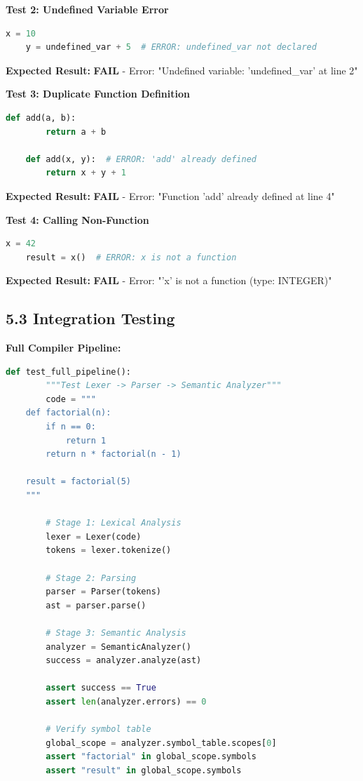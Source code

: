 \documentclass[a4paper,11pt]{article}
\newcommand{\statusissue}[1]{\colorbox{red!20}{\textbf{#1}}}
\begin{document}
    \textbf{Test 2: Undefined Variable Error}

    \begin{lstlisting}[language=Python, caption=Undefined Variable Detection]
    x = 10
    y = undefined_var + 5  # ERROR: undefined_var not declared
    \end{lstlisting}

    \textbf{Expected Result:} \statusissue{FAIL} - Error: "Undefined variable: 'undefined\_var' at line 2"

    \textbf{Test 3: Duplicate Function Definition}

    \begin{lstlisting}[language=Python, caption=Duplicate Definition Detection]
    def add(a, b):
        return a + b

    def add(x, y):  # ERROR: 'add' already defined
        return x + y + 1
    \end{lstlisting}

    \textbf{Expected Result:} \statusissue{FAIL} - Error: "Function 'add' already defined at line 4"

    \textbf{Test 4: Calling Non-Function}

    \begin{lstlisting}[language=Python, caption=Invalid Function Call]
    x = 42
    result = x()  # ERROR: x is not a function
    \end{lstlisting}

    \textbf{Expected Result:} \statusissue{FAIL} - Error: "'x' is not a function (type: INTEGER)"

    \subsection{5.3 Integration Testing}

    \textbf{Full Compiler Pipeline:}

    \begin{lstlisting}[language=Python, caption=Integration Test]
    def test_full_pipeline():
        """Test Lexer -> Parser -> Semantic Analyzer"""
        code = """
    def factorial(n):
        if n == 0:
            return 1
        return n * factorial(n - 1)

    result = factorial(5)
    """
        
        # Stage 1: Lexical Analysis
        lexer = Lexer(code)
        tokens = lexer.tokenize()
        
        # Stage 2: Parsing
        parser = Parser(tokens)
        ast = parser.parse()
        
        # Stage 3: Semantic Analysis
        analyzer = SemanticAnalyzer()
        success = analyzer.analyze(ast)
        
        assert success == True
        assert len(analyzer.errors) == 0
        
        # Verify symbol table
        global_scope = analyzer.symbol_table.scopes[0]
        assert "factorial" in global_scope.symbols
        assert "result" in global_scope.symbols
    \end{lstlisting}
\end{document}

